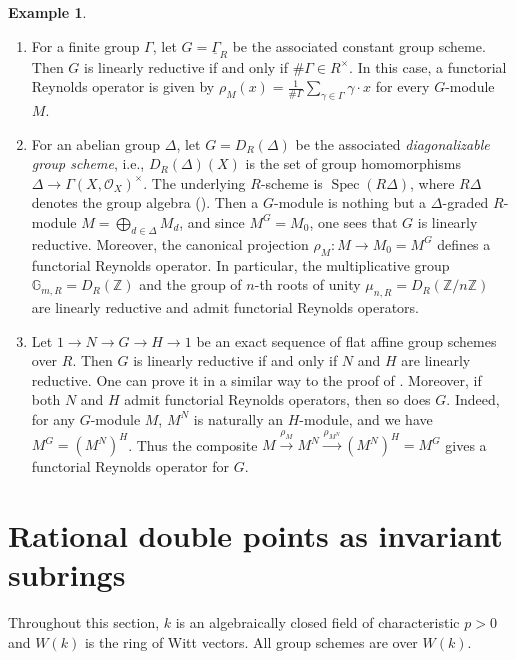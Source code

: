 \documentclass[uplatex,11pt,a4paper]{amsart} %
\numberwithin{equation}{section}
\numberwithin{figure}{section}
\numberwithin{table}{section}
\theoremstyle{plain}
\theoremstyle{definition}
\newtheorem{example}[theorem]{Example}
\newcommand{\ul}{\underline}
\newcommand{\xr}{\xrightarrow}
\newcommand{\Z}{\mathbb{Z}}
\newcommand{\G}{\mathbb{G}}
\newcommand{\scrO}{\mathscr{O}}
\DeclareMathOperator{\Spec}{Spec}
\begin{document}
\begin{example}
\label{ex:linred}
  \begin{enumerate}
  \item For a finite group $\Gamma$, let $G=\ul{\Gamma}_R$ be the associated constant group scheme. Then $G$ is linearly reductive if and only if $\#\Gamma\in R^\times$. In this case, a functorial Reynolds operator is given by $\rho_M(x)=\tfrac{1}{\#\Gamma}\sum\limits_{\gamma\in\Gamma}\gamma\cdot x$ for every $G$-module $M$.
  \item For an abelian group $\Delta$, let $G=D_R(\Delta)$ be the associated \emph{diagonalizable group scheme}, i.e., $D_R(\Delta)(X)$ is the set of group homomorphisms $\Delta\to\Gamma(X,\scrO_X)^\times$. The underlying $R$-scheme is $\Spec(R\Delta)$, where $R\Delta$ denotes the group algebra (\cite[Expos\'{e} I, 4.4]{SGA3-1}). Then a $G$-module is nothing but a $\Delta$-graded $R$-module $M=\bigoplus_{d\in\Delta}M_d$, and since $M^G=M_0$, one sees that $G$ is linearly reductive. Moreover, the canonical projection $\rho_M\colon M\to M_0=M^G$ defines a functorial Reynolds operator. In particular, the multiplicative group $\G_{m,R}=D_R(\Z)$ and the group of $n$-th roots of unity $\mu_{n,R}=D_R(\Z/n\Z)$ are linearly reductive and admit functorial Reynolds operators.
  \item Let $1\to N\to G\to H\to 1$ be an exact sequence of flat affine group schemes over $R$. Then $G$ is linearly reductive if and only if $N$ and $H$ are linearly reductive. One can prove it in a similar way to the proof of \cite[Lemma 2.2]{Has15}. Moreover, if both $N$ and $H$ admit functorial Reynolds operators, then so does $G$. Indeed, for any $G$-module $M$, $M^N$ is naturally an $H$-module, and we have $M^G=(M^N)^H$. Thus the composite $M\xr{\rho_M} M^N \xr{\rho_{M^N}} (M^N)^H=M^G$ gives a functorial Reynolds operator for $G$.
  \end{enumerate}
\end{example}


\section{Rational double points as invariant subrings}
\label{s:RDPG}

Throughout this section, $k$ is an algebraically closed field of characteristic $p>0$ and $W(k)$ is the ring of Witt vectors. All group schemes are over $W(k)$.
\end{document}
